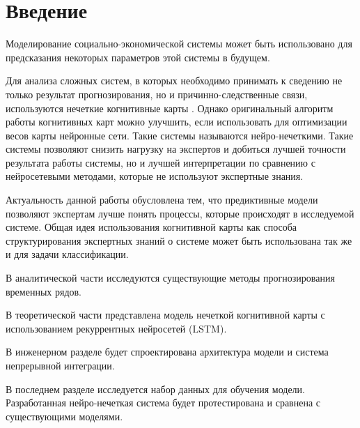 \chapter*{Введение}
\label{sec:afterwords}

Моделирование социально-экономической системы может быть использовано для предсказания
некоторых параметров этой системы в будущем.

Для анализа сложных систем, в которых необходимо принимать к сведению
не только результат прогнозирования,
но и причинно-следственные связи,
используются нечеткие когнитивные карты \cite{osoba2019dags} \cite{kosko1986fuzzy}.
Однако оригинальный алгоритм работы когнитивных карт можно улучшить,
если использовать для оптимизации весов карты нейронные сети.
Такие системы называются нейро-нечеткими.
Такие системы позволяют снизить нагрузку на экспертов и
добиться лучшей точности результата работы системы, но и лучшей интерпретации по сравнению
с нейросетевыми методами, которые не используют экспертные знания.

Актуальность данной работы обусловлена тем, что предиктивные модели
позволяют экспертам лучше понять процессы, которые происходят в
исследуемой системе. Общая идея использования когнитивной карты
как способа структурирования экспертных знаний о системе
может быть использована так же и для задачи классификации.

В аналитической части исследуются существующие методы прогнозирования
временных рядов.

В теоретической части представлена модель нечеткой когнитивной карты с использованием
рекуррентных нейросетей (LSTM).

В инженерном разделе будет спроектирована архитектура модели и
система непрерывной интеграции.

В последнем разделе исследуется набор данных для обучения модели.
Разработанная нейро-нечеткая система будет протестирована и сравнена
с существующими моделями.